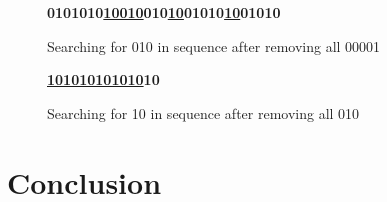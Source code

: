 \documentclass[10pt,letterpaper,notitlepage,draft]{article}
\theoremstyle{definition}
\begin{document}
\begin{figure}[h!]
\begin{center}
{\bf 0101010\underline{10}\underline{010}010\underline{10}01010\underline{10}01010}
\end{center}
\caption{Searching for 010 in sequence after removing all 00001}\label{c5}
\end{figure}

\begin{figure}[h!]
\begin{center}
{\bf \underline{101010101010}10}
\end{center}
\caption{Searching for 10 in sequence after removing all 010}\label{c6}
\end{figure}


\section{Conclusion}

\nocite{*}

%
% 

\end{document}
